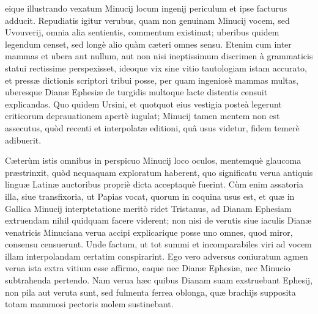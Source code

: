 \documentclass[a4paper, 11pt, oneside, polutonikogreek, latin]{article}
\begin{document}
eique illustrando vexatum Minucij locum ingenij periculum et ipse facturus adducit. Repudiatis igitur verubus, quam non genuinam Minucij vocem, sed Uvouverij, omnia alia sentientis, commentum existimat; uberibus quidem legendum censet, sed longè alio quàm cæteri omnes sensu. Etenim cum inter mammas et ubera aut nullum, aut non nisi ineptissimum discrimen à grammaticis statui rectissime perspexisset, ideoque vix sine vitio tautologiam istam accurato, et pressæ dictionis scriptori tribui posse, per quam ingeniosè mammas multas, uberesque Dianæ Ephesiæ de turgidis multoque lacte distentis censuit explicandas. Quo quidem Ursini, et quotquot eius vestigia posteà legerunt criticorum deprauationem apertè iugulat; Minucij tamen mentem non est assecutus, quòd recenti et interpolatæ editioni, quâ usus videtur, fidem temerè adibuerit.

Cæterùm istis omnibus in perspicuo Minucij loco oculos, mentemquè glaucoma præstrinxit, quòd nequaquam exploratum haberent, quo significatu verua antiquis linguæ Latinæ auctoribus propriè dicta acceptaquè fuerint. Cùm enim assatoria illa, siue transfixoria, ut Papias vocat, quorum in coquina usus est, et quæ in Gallica Minucij interptetatione meritò ridet Tristanus, ad Dianam Ephesiam extruendam nihil quidquam facere viderent; non nisi de verutis siue iaculis Dianæ venatricis Minuciana verua accipi explicarique posse uno omnes, quod miror, consensu censuerunt. Unde factum, ut tot summi et incomparabiles viri ad vocem illam interpolandam certatim conspirarint. Ego vero adversus coniuratum agmen verua ista extra vitium esse affirmo, eaque nec Dianæ Ephesiæ, nec Minucio subtrahenda pertendo. Nam verua hæc quibus Dianam suam exstruebant Ephesij, non pila aut veruta sunt, sed fulmenta ferrea oblonga, quæ brachijs supposita totam mammosi pectoris molem sustinebant.
\end{document}
